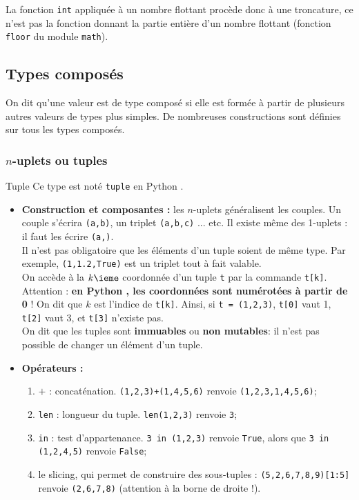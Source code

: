 La fonction \texttt{int} appliquée à un nombre flottant procède donc à une troncature, ce n'est pas la fonction donnant la partie entière d'un nombre flottant (fonction \texttt{floor} du module \texttt{math}).

\subsection{Types composés}
\begin{defi}{}
On dit qu'une valeur est de type composé si elle est formée à partir de plusieurs autres 
valeurs de types plus simples. De nombreuses constructions sont définies sur tous les types 
composés.
\end{defi}

\subsubsection{$n$-uplets ou tuples}

\begin{defi}{Tuple}
Ce type est noté \texttt{tuple} en Python .
\begin{itemize}
\item \textbf{Construction et composantes :} les $n$-uplets généralisent les couples. Un couple s'écrira \texttt{(a,b)}, un triplet 
\texttt{(a,b,c)} ... etc. Il existe même des 1-uplets : il faut les écrire \texttt{(a,)}.\\%
Il n'est pas obligatoire que les éléments d'un tuple soient de même type. Par exemple, 
\texttt{(1,1.2,True)} est un triplet tout à fait valable.\\
On accède à la $k\ieme$ coordonnée d'un tuple \texttt{t} par la commande \texttt{t[k]}. Attention : 
\textbf{en Python , les coordonnées sont numérotées à partir de 0} ! On dit que $k$ est 
l'{indice} de \texttt{t[k]}. Ainsi, si \texttt{t = (1,2,3)}, \texttt{t[0]} vaut 1, 
\texttt{t[2]} vaut 3, et \texttt{t[3]} n'existe pas.\\
On dit que les tuples sont \textbf{immuables} ou \textbf{non mutables}: il n'est pas possible de changer un élément d'un 
tuple.
\item \textbf{Opérateurs :}
\begin{enumerate}
 \item $+$ : concaténation. \texttt{(1,2,3)+(1,4,5,6)} renvoie \texttt{(1,2,3,1,4,5,6)};
 \item \texttt{len} : {longueur} du tuple. \texttt{len(1,2,3)} renvoie \texttt{3};
 \item \texttt{in} : test d'appartenance. \texttt{3 in (1,2,3)} renvoie \texttt{True}, alors que 
\texttt{3 in (1,2,4,5)} renvoie \texttt{False};
\item le {slicing}, qui permet de construire des sous-tuples : \texttt{(5,2,6,7,8,9)[1:5]} 
renvoie \texttt{(2,6,7,8)} (attention à la borne de droite !).\\
\end{enumerate}
\end{itemize}
\end{defi}


